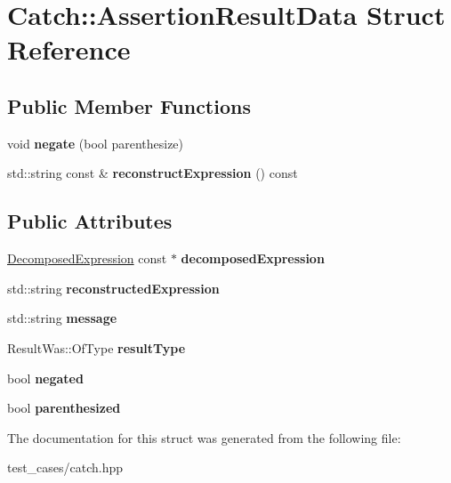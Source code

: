\hypertarget{structCatch_1_1AssertionResultData}{}\section{Catch\+:\+:Assertion\+Result\+Data Struct Reference}
\label{structCatch_1_1AssertionResultData}
\subsection*{Public Member Functions}
\begin{DoxyCompactItemize}
\item 
\mbox{\label{structCatch_1_1AssertionResultData_a3b4df7cd1f8228ea1144b5cd0af6006a}} 
void {\bfseries negate} (bool parenthesize)
\item 
\mbox{\label{structCatch_1_1AssertionResultData_adbc0629083cd2e76c3a78696453443b0}} 
std\+::string const  \& {\bfseries reconstruct\+Expression} () const
\end{DoxyCompactItemize}
\subsection*{Public Attributes}
\begin{DoxyCompactItemize}
\item 
\mbox{\label{structCatch_1_1AssertionResultData_a45b2bf2ed11da83d09dd78a2b7a44cd4}} 
\hyperlink{structCatch_1_1DecomposedExpression}{Decomposed\+Expression} const  $\ast$ {\bfseries decomposed\+Expression}
\item 
\mbox{\label{structCatch_1_1AssertionResultData_a9e809d36fffbeb1c7d0cbe7382dd9595}} 
std\+::string {\bfseries reconstructed\+Expression}
\item 
\mbox{\label{structCatch_1_1AssertionResultData_ac34215803c4c4a88f795879f61c1f7b4}} 
std\+::string {\bfseries message}
\item 
\mbox{\label{structCatch_1_1AssertionResultData_a7ceab4a7ff722aec5587e3748caf66b7}} 
Result\+Was\+::\+Of\+Type {\bfseries result\+Type}
\item 
\mbox{\label{structCatch_1_1AssertionResultData_a17773c6f999cfded12e470b0321694a1}} 
bool {\bfseries negated}
\item 
\mbox{\label{structCatch_1_1AssertionResultData_a8418e3744b5486cb7f0d79c84569078e}} 
bool {\bfseries parenthesized}
\end{DoxyCompactItemize}


The documentation for this struct was generated from the following file\+:\begin{DoxyCompactItemize}
\item 
test\+\_\+cases/catch.\+hpp\end{DoxyCompactItemize}
